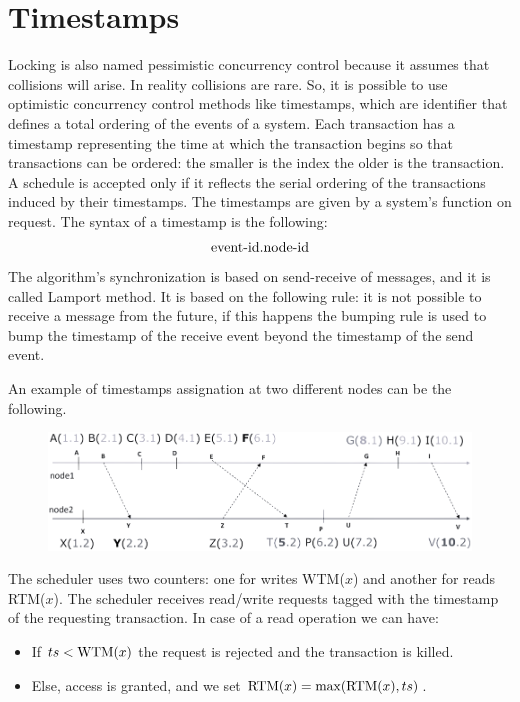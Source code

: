\documentclass[12pt, a4paper]{report}
\newtheorem[style=M,bodystyle=\normalfont]{theorem}{Theorem}
\newtheorem[style=M,bodystyle=\normalfont]{corollary}{Corollary}
\newtheorem[style=M,bodystyle=\normalfont]{lemma}{Lemma}
\newtheorem[style=M,bodystyle=\normalfont]{definition}{Definition}
\begin{document}
    \section{Timestamps}
    Locking is also named pessimistic concurrency control because it assumes that collisions will arise. In reality collisions are rare. So, it is possible to use optimistic 
    concurrency control methods like timestamps, which are identifier that defines a total ordering of the events of a system. Each transaction has a timestamp representing the time 
    at which the transaction begins so that transactions can be ordered: the smaller is the index the older is the transaction. A schedule is accepted only if it reflects the serial 
    ordering of the transactions induced by their timestamps. The timestamps are given by a system's function on request. The syntax of a timestamp is the following: 
    \[\textnormal{event-id}.\textnormal{node-id}\]
    The algorithm's synchronization is based on send-receive of messages, and it is called Lamport method. It is based on the following rule: it is not possible to receive a  message 
    from the future, if this happens the bumping rule is used to bump the timestamp of the receive event beyond the timestamp of the send event.     
    \begin{example}
        An example of timestamps assignation at two different nodes can be the following. 
        \begin{figure}[H]
            \centering
            \includegraphics[width=0.75\linewidth]{images/timestamps.png}
        \end{figure}
    \end{example}
    The scheduler uses two counters: one for writes WTM($x$) and another for reads RTM($x$). The scheduler receives read/write requests tagged with the timestamp of the 
    requesting transaction. In case of a read operation we can have: 
    \begin{itemize}
        \item If $ts<\textnormal{WTM}(x)$ the request is rejected and the transaction is killed. 
        \item Else, access is granted, and we set $\textnormal{RTM}(x)=\max(\textnormal{RTM}(x),ts)$. 
    \end{itemize}
\end{document}
